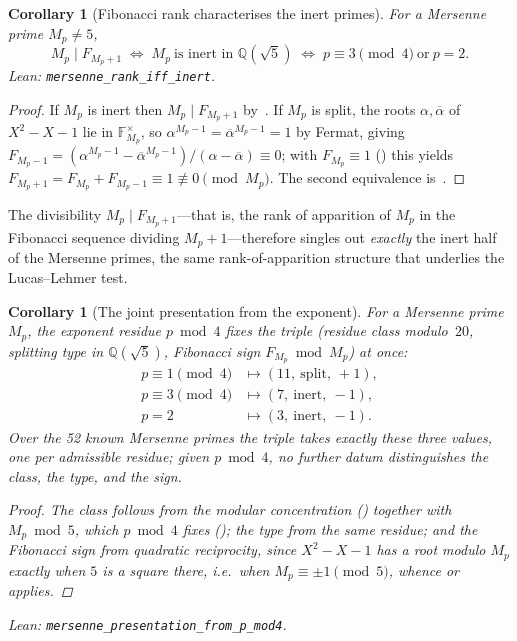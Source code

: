\documentclass[11pt]{amsart}
\newtheorem{Corollary}[Theorem]{Corollary}
\theoremstyle{definition}
\newcommand{\Mp}{M_{p}}
\newcommand{\lean}[1]{\texttt{#1}}
\begin{document}
\begin{Corollary}[Fibonacci rank characterises the inert primes]\label{prop:rank-inert}
For a Mersenne prime $\Mp\neq5$,
\[
  \Mp\mid F_{\Mp+1}
  \;\iff\;
  \Mp\ \text{is inert in }\mathbb{Q}(\sqrt5)
  \;\iff\;
  p\equiv3\!\!\pmod4\ \text{or}\ p=2.
\]
  \emph{Lean:} \lean{mersenne\_rank\_iff\_inert}.
\end{Corollary}

\begin{proof}
If $\Mp$ is inert then $\Mp\mid F_{\Mp+1}$ by~.  If
$\Mp$ is split, the roots $\alpha,\overline{\alpha}$ of $X^{2}-X-1$ lie in
$\mathbb{F}_{\Mp}^{\times}$, so $\alpha^{\Mp-1}=\overline{\alpha}^{\Mp-1}=1$
by Fermat, giving
$F_{\Mp-1}=(\alpha^{\Mp-1}-\overline{\alpha}^{\Mp-1})/(\alpha-\overline{\alpha})\equiv0$;
with $F_{\Mp}\equiv1$ () this yields
$F_{\Mp+1}=F_{\Mp}+F_{\Mp-1}\equiv1\not\equiv0\pmod{\Mp}$.  The second
equivalence is~.
\end{proof}

The divisibility $\Mp\mid F_{\Mp+1}$---that is, the rank of apparition of
$\Mp$ in the Fibonacci sequence dividing $\Mp+1$---therefore singles out
\emph{exactly} the inert half of the Mersenne primes, the same
rank-of-apparition structure that underlies the Lucas--Lehmer test.

\begin{Corollary}[The joint presentation from the exponent]\label{cor:joint}
For a Mersenne prime $\Mp$, the exponent residue $p\bmod4$ fixes the
triple (residue class modulo~$20$, splitting type in $\mathbb{Q}(\sqrt5)$,
Fibonacci sign $F_{\Mp}\bmod\Mp$) at once:
\[
  \begin{aligned}
    p\equiv1\!\!\pmod4 &\mapsto(11,\ \mathrm{split},\ +1),\\
    p\equiv3\!\!\pmod4 &\mapsto(7,\ \mathrm{inert},\ -1),\\
    p=2 &\mapsto(3,\ \mathrm{inert},\ -1).
  \end{aligned}
\]
Over the 52 known Mersenne primes the triple takes exactly these three
values, one per admissible residue; given $p\bmod4$, no further datum
distinguishes the class, the type, and the sign.
\begin{proof}
The class follows from the modular concentration
() together with $\Mp\bmod5$, which
$p\bmod4$ fixes (); the type from the same
residue; and the Fibonacci sign from quadratic reciprocity, since
$X^{2}-X-1$ has a root modulo $\Mp$ exactly when $5$ is a square there,
i.e.\ when $\Mp\equiv\pm1\pmod5$, whence  or
 applies.
\end{proof}
\emph{Lean:} \lean{mersenne\_presentation\_from\_p\_mod4}.
\end{Corollary}
\end{document}
